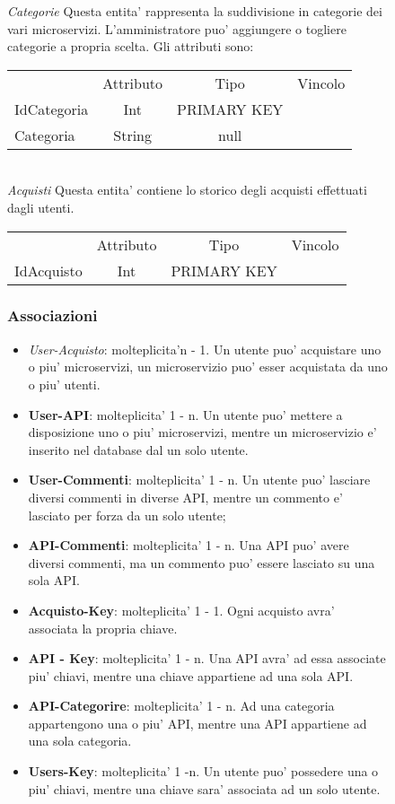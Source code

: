 {{\begin{figure}[ht]
			\textit{Categorie}
			Questa entita' rappresenta la suddivisione in categorie dei vari microservizi. L'amministratore puo' aggiungere o togliere categorie a propria scelta. Gli attributi sono: 
			\begin{center}
			\begin{tabular}{lccc}
				&Attributo&Tipo&Vincolo\\
				IdCategoria&Int&PRIMARY KEY\\
				Categoria&String&null \\			
			\end{tabular}
			\end{center}\\
			
			\textit{Acquisti}
			Questa entita' contiene lo storico degli acquisti effettuati dagli utenti.
			\begin{center}
			\begin{tabular}{lccc}
				&Attributo&Tipo&Vincolo\\
				IdAcquisto&Int&PRIMARY KEY\\
			\end{tabular}
			\end{center}
	\subsubsection{Associazioni}
		\begin{itemize}
			\item\textit{User-Acquisto}: molteplicita'n - 1. Un utente puo' acquistare uno o piu' microservizi, un microservizio puo' esser acquistata da uno o piu' utenti.
			\item\textbf{User-API}: molteplicita' 1 - n. Un utente puo' mettere a disposizione uno o piu' microservizi, mentre un microservizio e' inserito nel database dal un solo utente.
			\item\textbf{User-Commenti}: molteplicita' 1 - n. Un utente puo' lasciare diversi commenti in diverse API, mentre un commento e' lasciato per forza da un solo utente;
			\item\textbf{API-Commenti}: molteplicita' 1 - n. Una API puo' avere diversi commenti, ma un commento puo' essere lasciato su una sola API.	
			\item\textbf{Acquisto-Key}: molteplicita' 1 - 1. Ogni acquisto avra' associata la propria chiave. 
			\item\textbf{API - Key}: molteplicita' 1 - n. Una API avra' ad essa associate piu' chiavi, mentre una chiave appartiene ad una sola API.
			\item\textbf{API-Categorire}: molteplicita' 1 - n. Ad una categoria appartengono una o piu' API, mentre una API appartiene ad una sola categoria.
			\item\textbf{Users-Key}: molteplicita' 1 -n. Un utente puo' possedere una o piu' chiavi, mentre una chiave sara' associata ad un solo utente.
		\end{itemize}				
								

\end{figure}}}
